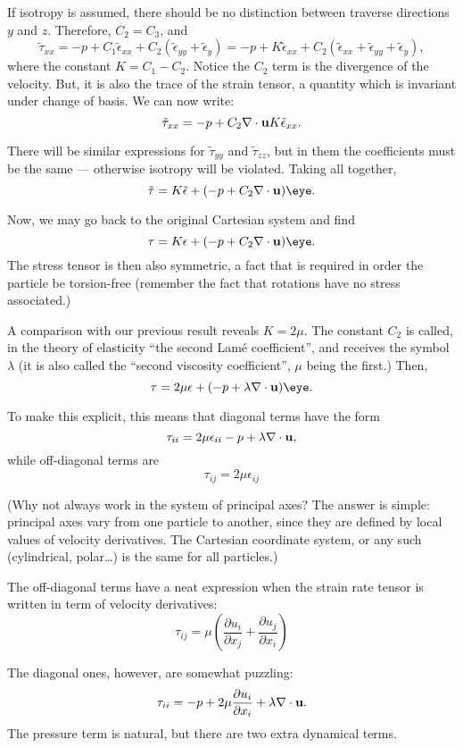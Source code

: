 If isotropy is assumed, there should be no distinction between
traverse directions $y$ and $z$. Therefore, $C_2=C_3$, and
\[
\tilde{\tau}_{xx}=
- p + 
C_1 \tilde{\epsilon}_{xx} +
C_2 ( \tilde{\epsilon}_{yy} +  \tilde{\epsilon}_{y}  ) =
- p + 
K \tilde{\epsilon}_{xx} +
C_2 ( \tilde{\epsilon}_{xx} + \tilde{\epsilon}_{yy} +  \tilde{\epsilon}_{y}  ) ,
\]
where the constant $K=C_1-C_2$. Notice the $C_2$ term is the
divergence of the velocity. But, it is also the trace of the strain
tensor, a quantity which is invariant under change of basis. We can
now write:
\[
\tilde{\tau}_{xx}=
- p + C_2 \nabla\cdot \mathbf{u} 
K \tilde{\epsilon}_{xx} .
\]

There will be similar expressions for $\tilde{\tau}_{yy}$ and
$\tilde{\tau}_{zz}$, but in them the coefficients must be the same ---
otherwise isotropy will be violated. Taking all together,
\[
\tilde{\tau}=
K \tilde{\epsilon}
+ ( - p + C_2 \nabla\cdot \bfu ) \eye.
\]

Now, we may go back to the original Cartesian system and find
\[
\tau=
K \epsilon
+ ( - p + C_2 \nabla\cdot \bfu ) \eye.
\]
The stress tensor is then also symmetric, a fact that is required in
order the particle be torsion-free (remember the fact that rotations
have no stress associated.)

A comparison with our previous result reveals $K=2\mu$. The constant
$C_2$ is called, in the theory of elasticity ``the second Lam\'e
coefficient'', and receives the symbol $\lambda$ (it is also called
the ``second viscosity coefficient'', $\mu$ being the first.) Then,
\[
\tau=
2 \mu \epsilon + ( - p + \lambda \nabla\cdot \bfu ) \eye.
\]

To make this explicit, this means that diagonal terms have the form
\[
\tau_{ii}=
2 \mu \epsilon_{ii}  - p + \lambda \nabla\cdot \mathbf{u} ,
\]
while off-diagonal terms are
\[
\tau_{ij}=
2 \mu \epsilon_{ij}
\]

(Why not always work in the system of principal axes? The answer is
simple: principal axes vary from one particle to another, since they
are defined by local values of velocity derivatives. The Cartesian
coordinate system, or any such (cylindrical, polar\ldots) is the same
for all particles.)

The off-diagonal terms have a neat expression when the strain rate
tensor is written in term of velocity derivatives:
\[
\tau_{ij}=
\mu
\left(
\frac{\partial u_i}{\partial x_j} +
\frac{\partial u_j}{\partial x_i}
\right)
\]

The diagonal ones, however, are somewhat puzzling:
\[
\tau_{ii}=
- p +
2 \mu \frac{\partial u_i}{\partial x_i}  + \lambda \nabla\cdot \mathbf{u} .
\]
The pressure term is natural, but there are two extra dynamical terms.

